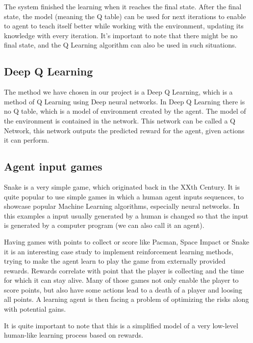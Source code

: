 \documentclass[]{article}
\begin{document}
\par The system finished the learning when it reaches the final state. After the final state, the model (meaning the Q table) can be used for next iterations to enable to agent to teach itself better while working with the environment, updating its knowledge with every iteration. It's important to note that there might be no final state, and the Q Learning algorithm can also be used in such situations. 

\subsection{Deep Q Learning}

\par The method we have chosen in our project is a Deep Q Learning, which is a method of Q Learning using Deep neural networks. In Deep Q Learning there is no Q table, which is a model of environment created by the agent. The model of the environment is contained in the network. This network can be called a Q Network, this network outputs the predicted reward for the agent, given actions it can perform.

\subsection{Agent input games}

\par Snake is a very simple game, which originated back in the XXth Century. It is quite popular to use simple games in which a human agent inputs sequences, to showcase popular Machine Learning algorithms, especially neural networks. In this examples a input usually generated by a human is changed so that the input is generated by a computer program (we can also call it an agent). 

\par Having games with points to collect or score like Pacman, Space Impact or Snake it is an interesting case study to implement reinforcement learning methods, trying to make the agent learn to play the game from externally provided rewards. Rewards correlate with point that the player is collecting and the time for which it can stay alive. Many of those games not only enable the player to score points, but also have some actions lead to a death of a player and loosing all points. A learning agent is then facing a problem of optimizing the risks along with potential gains. 

\par It is quite important to note that this is a simplified model of a very low-level human-like learning process based on rewards.
\end{document}
